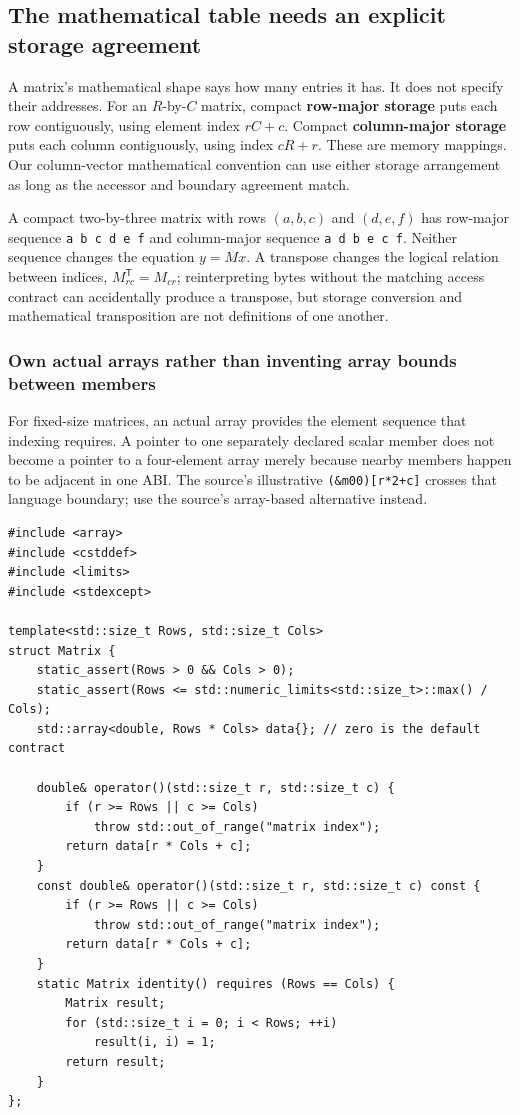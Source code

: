 \subsection{The mathematical table needs an explicit storage agreement}\label{the-mathematical-table-needs-an-explicit-storage-agreement}

A matrix's mathematical shape says how many entries it has. It does not specify their addresses. For an \(R\)-by-\(C\) matrix, compact \textbf{row-major storage} puts each row contiguously, using element index \(rC+c\). Compact \textbf{column-major storage} puts each column contiguously, using index \(cR+r\). These are memory mappings. Our column-vector mathematical convention can use either storage arrangement as long as the accessor and boundary agreement match.

A compact two-by-three matrix with rows \((a,b,c)\) and \((d,e,f)\) has row-major sequence \texttt{a\ b\ c\ d\ e\ f} and column-major sequence \texttt{a\ d\ b\ e\ c\ f}. Neither sequence changes the equation \(y=Mx\). A transpose changes the logical relation between indices, \(M^{\mathsf T}_{rc}=M_{cr}\); reinterpreting bytes without the matching access contract can accidentally produce a transpose, but storage conversion and mathematical transposition are not definitions of one another.

\subsubsection{Own actual arrays rather than inventing array bounds between members}\label{own-actual-arrays-rather-than-inventing-array-bounds-between-members}

For fixed-size matrices, an actual array provides the element sequence that indexing requires. A pointer to one separately declared scalar member does not become a pointer to a four-element array merely because nearby members happen to be adjacent in one ABI. The source's illustrative \texttt{(\&m00){[}r*2+c{]}} crosses that language boundary; use the source's array-based alternative instead.

\begin{verbatim}
#include <array>
#include <cstddef>
#include <limits>
#include <stdexcept>

template<std::size_t Rows, std::size_t Cols>
struct Matrix {
    static_assert(Rows > 0 && Cols > 0);
    static_assert(Rows <= std::numeric_limits<std::size_t>::max() / Cols);
    std::array<double, Rows * Cols> data{}; // zero is the default contract

    double& operator()(std::size_t r, std::size_t c) {
        if (r >= Rows || c >= Cols)
            throw std::out_of_range("matrix index");
        return data[r * Cols + c];
    }
    const double& operator()(std::size_t r, std::size_t c) const {
        if (r >= Rows || c >= Cols)
            throw std::out_of_range("matrix index");
        return data[r * Cols + c];
    }
    static Matrix identity() requires (Rows == Cols) {
        Matrix result;
        for (std::size_t i = 0; i < Rows; ++i)
            result(i, i) = 1;
        return result;
    }
};
\end{verbatim}

